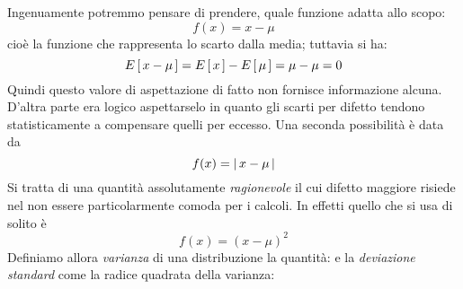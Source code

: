 Ingenuamente potremmo pensare di prendere, quale funzione adatta allo scopo:
$$
f(x) = x - \mu
$$
cio\`e la funzione che rappresenta lo scarto
dalla media; tuttavia si ha:
$$
\displaystyle E\left[\, x - \mu \, \right] = \displaystyle E\left[\, x \, \right] - \displaystyle E\left[\, \mu \, \right] = \mu - \mu = 0
$$
Quindi questo valore di aspettazione di fatto non fornisce informazione
alcuna. D'altra parte era logico aspettarselo in quanto gli scarti per
difetto tendono statisticamente a compensare quelli per eccesso.
Una seconda possibilit\`a \`e data da
$$
f(x)=\left| \, x - \mu \, \right|
$$
Si tratta di una quantit\`a assolutamente {\itshape ragionevole}
il cui difetto maggiore risiede nel non essere particolarmente comoda
per i calcoli.
In effetti quello che si usa di solito \`e 
$$
f(x) = (x - \mu)^2
$$
Definiamo allora {\itshape varianza} di una distribuzione la quantit\`a:
e la {\itshape deviazione standard} come la radice quadrata della varianza:

